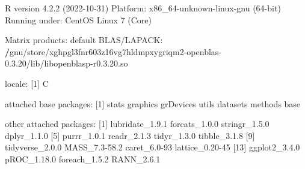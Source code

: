 \documentclass[
]{article}
\newenvironment{Shaded}{\begin{snugshade}}{\end{snugshade}}
\newcommand{\DecValTok}[1]{\textcolor[rgb]{0.00,0.00,0.81}{#1}}
\newcommand{\ErrorTok}[1]{\textcolor[rgb]{0.64,0.00,0.00}{\textbf{#1}}}
\newcommand{\FloatTok}[1]{\textcolor[rgb]{0.00,0.00,0.81}{#1}}
\newcommand{\FunctionTok}[1]{\textcolor[rgb]{0.00,0.00,0.00}{#1}}
\newcommand{\NormalTok}[1]{#1}
\newcommand{\SpecialCharTok}[1]{\textcolor[rgb]{0.00,0.00,0.00}{#1}}
\begin{document}
\begin{Shaded}
\begin{Highlighting}[]
\NormalTok{R version }\DecValTok{4}\NormalTok{.}\FloatTok{2.2}\NormalTok{ (}\DecValTok{2022{-}10{-}31}\NormalTok{)}
\NormalTok{Platform}\SpecialCharTok{:}\NormalTok{ x86\_64}\SpecialCharTok{{-}}\NormalTok{unknown}\SpecialCharTok{{-}}\NormalTok{linux}\SpecialCharTok{{-}}\FunctionTok{gnu}\NormalTok{ (}\DecValTok{64}\SpecialCharTok{{-}}\NormalTok{bit)}
\NormalTok{Running under}\SpecialCharTok{:}\NormalTok{ CentOS Linux }\DecValTok{7}\NormalTok{ (Core)}

\NormalTok{Matrix products}\SpecialCharTok{:}\NormalTok{ default}
\NormalTok{BLAS}\SpecialCharTok{/}\NormalTok{LAPACK}\SpecialCharTok{:} \ErrorTok{/}\NormalTok{gnu}\SpecialCharTok{/}\NormalTok{store}\SpecialCharTok{/}\NormalTok{xghpgl3fnr603z16vg7hldmpxygriqm2}\SpecialCharTok{{-}}\NormalTok{openblas}\DecValTok{{-}0}\NormalTok{.}\FloatTok{3.20}\SpecialCharTok{/}\NormalTok{lib}\SpecialCharTok{/}\NormalTok{libopenblasp}\SpecialCharTok{{-}}\NormalTok{r0.}\DecValTok{3}\NormalTok{.}\FloatTok{20.}\NormalTok{so}

\NormalTok{locale}\SpecialCharTok{:}
\NormalTok{[}\DecValTok{1}\NormalTok{] C}

\NormalTok{attached base packages}\SpecialCharTok{:}
\NormalTok{[}\DecValTok{1}\NormalTok{] stats     graphics  grDevices utils     datasets  methods   base     }

\NormalTok{other attached packages}\SpecialCharTok{:}
\NormalTok{ [}\DecValTok{1}\NormalTok{] lubridate\_1.}\FloatTok{9.1}\NormalTok{ forcats\_1.}\FloatTok{0.0}\NormalTok{   stringr\_1.}\FloatTok{5.0}\NormalTok{   dplyr\_1.}\FloatTok{1.0}    
\NormalTok{ [}\DecValTok{5}\NormalTok{] purrr\_1.}\FloatTok{0.1}\NormalTok{     readr\_2.}\FloatTok{1.3}\NormalTok{     tidyr\_1.}\FloatTok{3.0}\NormalTok{     tibble\_3.}\FloatTok{1.8}   
\NormalTok{ [}\DecValTok{9}\NormalTok{] tidyverse\_2.}\FloatTok{0.0}\NormalTok{ MASS\_7}\FloatTok{.3{-}58.2}\NormalTok{   caret\_6}\FloatTok{.0}\DecValTok{{-}93}\NormalTok{    lattice\_0}\FloatTok{.20}\DecValTok{{-}45}
\NormalTok{[}\DecValTok{13}\NormalTok{] ggplot2\_3.}\FloatTok{4.0}\NormalTok{   pROC\_1.}\FloatTok{18.0}\NormalTok{     foreach\_1.}\FloatTok{5.2}\NormalTok{   RANN\_2.}\FloatTok{6.1}     


\end{Highlighting}
\end{Shaded}
\end{document}
